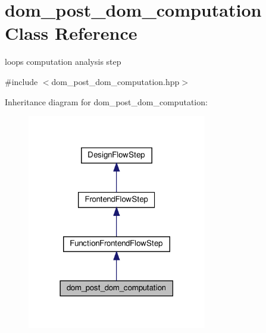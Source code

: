 \hypertarget{classdom__post__dom__computation}{}\section{dom\+\_\+post\+\_\+dom\+\_\+computation Class Reference}
\label{classdom__post__dom__computation}


loops computation analysis step  




{\ttfamily \#include $<$dom\+\_\+post\+\_\+dom\+\_\+computation.\+hpp$>$}



Inheritance diagram for dom\+\_\+post\+\_\+dom\+\_\+computation\+:
\nopagebreak
\begin{figure}[H]
\begin{center}
\leavevmode
\includegraphics[width=222pt]{da/d5c/classdom__post__dom__computation__inherit__graph}
\end{center}
\end{figure}



